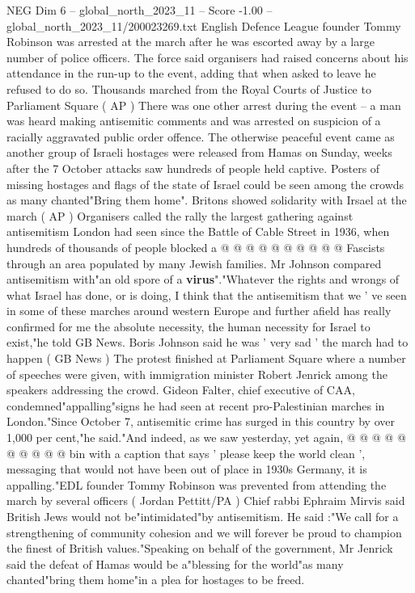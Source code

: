 \begin{textsample}{NEG Dim 6 – global\_north\_2023\_11 – Score -1.00 – global\_north\_2023\_11/200023269.txt}  \label{ex:f6_neg_235}
English Defence League founder Tommy Robinson was arrested at the march after he was escorted away by a large number of police officers.
The force said organisers had raised concerns about his attendance in the run-up to the event, adding that when asked to leave he refused to do so.
Thousands marched from the Royal Courts of Justice to Parliament Square ( AP ) There was one other arrest during the event -- a man was heard making antisemitic comments and was arrested on suspicion of a racially aggravated public order offence.
The otherwise peaceful event came as another group of Israeli hostages were released from Hamas on Sunday, weeks after the 7 October attacks saw hundreds of people held captive.
Posters of missing hostages and flags of the state of Israel could be seen among the crowds as many chanted"Bring them home".
Britons showed solidarity with Irsael at the march ( AP ) Organisers called the rally the largest gathering against antisemitism London had seen since the Battle of Cable Street in 1936, when hundreds of thousands of people blocked a @ @ @ @ @ @ @ @ @ @ Fascists through an area populated by many Jewish families.
Mr Johnson compared antisemitism with"an old spore of a \textbf{virus}"."Whatever the rights and wrongs of what Israel has done, or is doing, I think that the antisemitism that we ' ve seen in some of these marches around western Europe and further afield has really confirmed for me the absolute necessity, the human necessity for Israel to exist,"he told GB News.
Boris Johnson said he was ' very sad ' the march had to happen ( GB News ) The protest finished at Parliament Square where a number of speeches were given, with immigration minister Robert Jenrick among the speakers addressing the crowd.
Gideon Falter, chief executive of CAA, condemned"appalling"signs he had seen at recent pro-Palestinian marches in London."Since October 7, antisemitic crime has surged in this country by over 1,000 per cent,"he said."And indeed, as we saw yesterday, yet again, @ @ @ @ @ @ @ @ @ @ bin with a caption that says ' please keep the world clean ', messaging that would not have been out of place in 1930s Germany, it is appalling."EDL founder Tommy Robinson was prevented from attending the march by several officers ( Jordan Pettitt/PA ) Chief rabbi Ephraim Mirvis said British Jews would not be"intimidated"by antisemitism.
He said :"We call for a strengthening of community cohesion and we will forever be proud to champion the finest of British values."Speaking on behalf of the government, Mr Jenrick said the defeat of Hamas would be a"blessing for the world"as many chanted"bring them home"in a plea for hostages to be freed.

\end{textsample}
